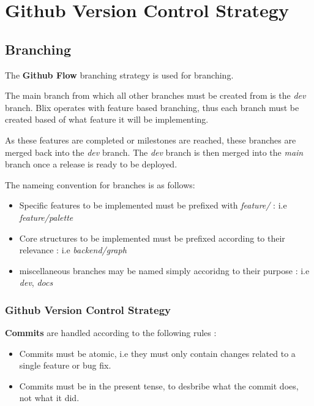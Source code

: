 \documentclass[11pt,a4paper]{article}
\begin{document}
\section*{Github Version Control Strategy}

\subsection*{Branching}

The \textbf{Github Flow} branching strategy is used for branching.

The main branch from which all other branches must be created from is the \textit{dev} branch.
Blix operates with feature based branching, thus each branch must be created based of what feature
it will be implementing.

As these features are completed or milestones are reached, these branches are merged back into the \textit{dev} branch.
The \textit{dev} branch is then merged into the \textit{main} branch once a release is ready to be deployed.

The nameing convention for branches is as follows:
\begin{itemize}
    \item[\textbullet] Specific features to be implemented must be prefixed with \textit{feature/} : i.e \textit{feature/palette}
    \item[\textbullet] Core structures to be implemented must be prefixed according to their relevance : \hspace{3cm} i.e \textit{backend/graph}
    \item[\textbullet] miscellaneous branches may be named simply accoridng to their purpose : i.e \textit{dev}, \textit{docs}
\end{itemize}

\subsubsection*{Github Version Control Strategy}

\textbf{Commits} are handled according to the following rules : 
\begin{itemize}
    \item[\textbullet] Commits must be atomic, i.e they must only contain changes related to a single feature or bug fix.
    \item[\textbullet] Commits must be in the present tense, to desbribe what the commit does, not what it did.
\end{itemize}
\end{document}
